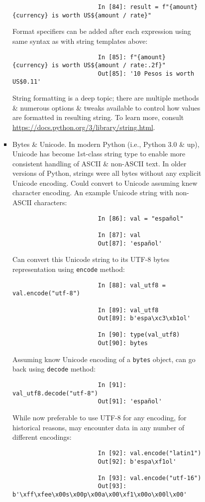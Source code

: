 \documentclass{article}
\begin{document}
\begin{enumerate}
\begin{itemize}
\begin{itemize}
\begin{itemize}
\begin{itemize}
\begin{verbatim}
						In [84]: result = f"{amount} {currency} is worth US${amount / rate}"
					\end{verbatim}
					Format specifiers can be added after each expression using same syntax as with string templates above:
					\begin{verbatim}
						In [85]: f"{amount} {currency} is worth US${amount / rate:.2f}"
						Out[85]: '10 Pesos is worth US$0.11'
					\end{verbatim}
					String formatting is a deep topic; there are multiple methods \& numerous options \& tweaks available to control how values are formatted in resulting string. To learn more, consult \url{https://docs.python.org/3/library/string.html}.
					\item {\sf Bytes \& Unicode.} In modern Python (i.e., Python 3.0 \& up), Unicode has become 1st-class string type to enable more consistent handling of ASCII \& non-ASCII text. In older versions of Python, strings were all bytes without any explicit Unicode encoding. Could convert to Unicode assuming knew character encoding. An example Unicode string with non-ASCII characters:
					\begin{verbatim}
						In [86]: val = "español"
						
						In [87]: val
						Out[87]: 'español'
					\end{verbatim}
					Can convert this Unicode string to its UTF-8 bytes representation using {\tt encode} method:
					\begin{verbatim}
						In [88]: val_utf8 = val.encode("utf-8")
						
						In [89]: val_utf8
						Out[89]: b'espa\xc3\xb1ol'
						
						In [90]: type(val_utf8)
						Out[90]: bytes
					\end{verbatim}
					Assuming know Unicode encoding of a {\tt bytes} object, can go back using {\tt decode} method:
					\begin{verbatim}
						In [91]: val_utf8.decode("utf-8")
						Out[91]: 'español'
					\end{verbatim}
					While now preferable to use UTF-8 for any encoding, for historical reasons, may encounter data in any number of different encodings:
					\begin{verbatim}
						In [92]: val.encode("latin1")
						Out[92]: b'espa\xf1ol'
						
						In [93]: val.encode("utf-16")
						Out[93]: b'\xff\xfee\x00s\x00p\x00a\x00\xf1\x00o\x00l\x00'
						

\end{verbatim}
\end{itemize}
\end{itemize}
\end{itemize}
\end{itemize}
\end{enumerate}
\end{document}
